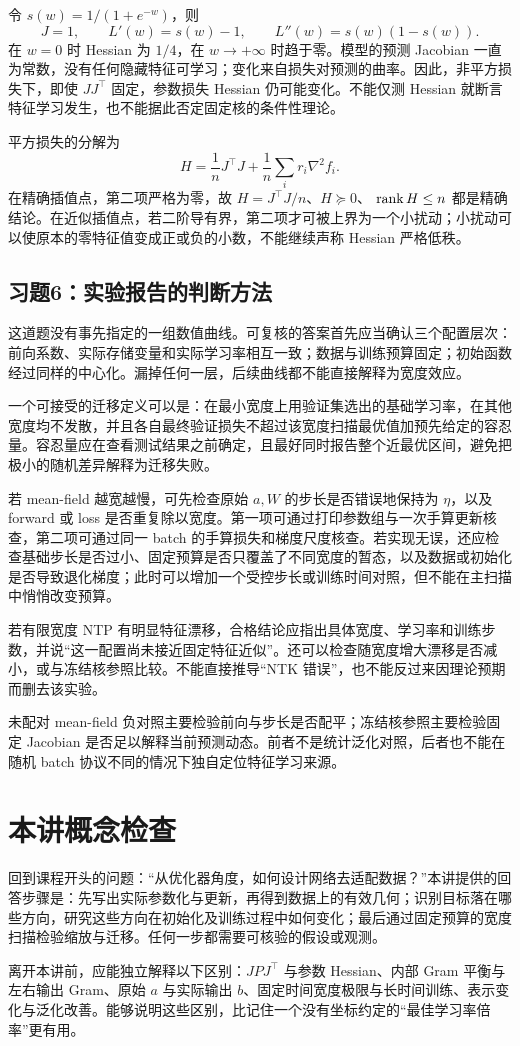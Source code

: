 令 $s(w)=1/(1+e^{-w})$，则
\[
 J=1,\qquad L'(w)=s(w)-1,
 \qquad L''(w)=s(w)(1-s(w)).
\]
在 $w=0$ 时 Hessian 为 $1/4$，在 $w\to+\infty$ 时趋于零。模型的预测 Jacobian 一直为常数，没有任何隐藏特征可学习；变化来自损失对预测的曲率。因此，非平方损失下，即使 $JJ^\top$ 固定，参数损失 Hessian 仍可能变化。不能仅测 Hessian 就断言特征学习发生，也不能据此否定固定核的条件性理论。

平方损失的分解为
\[
 H=\frac1nJ^\top J+\frac1n\sum_i r_i\nabla^2f_i.
\]
在精确插值点，第二项严格为零，故 $H=J^\top J/n$、$H\succeq0$、
$\operatorname{rank} H\leq n$ 都是精确结论。在近似插值点，若二阶导有界，第二项才可被上界为一个小扰动；小扰动可以使原本的零特征值变成正或负的小数，不能继续声称 Hessian 严格低秩。

\subsection*{习题6：实验报告的判断方法}

这道题没有事先指定的一组数值曲线。可复核的答案首先应当确认三个配置层次：前向系数、实际存储变量和实际学习率相互一致；数据与训练预算固定；初始函数经过同样的中心化。漏掉任何一层，后续曲线都不能直接解释为宽度效应。

一个可接受的迁移定义可以是：在最小宽度上用验证集选出的基础学习率，在其他宽度均不发散，并且各自最终验证损失不超过该宽度扫描最优值加预先给定的容忍量。容忍量应在查看测试结果之前确定，且最好同时报告整个近最优区间，避免把极小的随机差异解释为迁移失败。

若 mean-field 越宽越慢，可先检查原始 $a,W$ 的步长是否错误地保持为
$\eta$，以及 forward 或 loss 是否重复除以宽度。第一项可通过打印参数组与一次手算更新核查，第二项可通过同一 batch 的手算损失和梯度尺度核查。若实现无误，还应检查基础步长是否过小、固定预算是否只覆盖了不同宽度的暂态，以及数据或初始化是否导致退化梯度；此时可以增加一个受控步长或训练时间对照，但不能在主扫描中悄悄改变预算。

若有限宽度 NTP 有明显特征漂移，合格结论应指出具体宽度、学习率和训练步数，并说“这一配置尚未接近固定特征近似”。还可以检查随宽度增大漂移是否减小，或与冻结核参照比较。不能直接推导“NTK 错误”，也不能反过来因理论预期而删去该实验。

未配对 mean-field 负对照主要检验前向与步长是否配平；冻结核参照主要检验固定 Jacobian 是否足以解释当前预测动态。前者不是统计泛化对照，后者也不能在随机 batch 协议不同的情况下独自定位特征学习来源。

\section{本讲概念检查}
\label{l5:checklist}

回到课程开头的问题：“从优化器角度，如何设计网络去适配数据？”本讲提供的回答步骤是：先写出实际参数化与更新，再得到数据上的有效几何；识别目标落在哪些方向，研究这些方向在初始化及训练过程中如何变化；最后通过固定预算的宽度扫描检验缩放与迁移。任何一步都需要可核验的假设或观测。

离开本讲前，应能独立解释以下区别：$JPJ^\top$ 与参数 Hessian、内部 Gram 平衡与左右输出 Gram、原始 $a$ 与实际输出 $b$、固定时间宽度极限与长时间训练、表示变化与泛化改善。能够说明这些区别，比记住一个没有坐标约定的“最佳学习率倍率”更有用。
